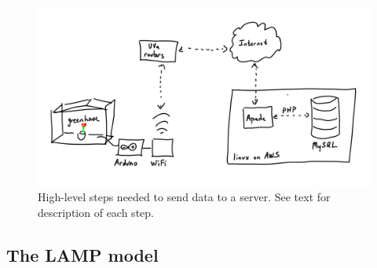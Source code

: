 \documentclass[11pt]{article} %
\begin{document}
\begin{figure}
\centering
\includegraphics[width=6in]{figures/connections}
\caption{High-level steps needed to send data to a server. See text for description of each step.}%
\label{fig:sending}
\end{figure}
%
%

\subsection*{The LAMP model}
\end{document}
